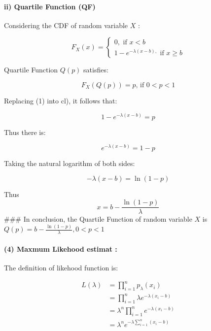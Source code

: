 \documentclass[
]{article}
\begin{document}
\paragraph{ii) Quartile Function (QF)}\label{ii-quartile-function-qf}

Considering the CDF of random variable \(X\) :

\[
F_{X}(x)=\left\{\begin{array}{l}
0, \text { if } x<b  \tag{1}\\
1-e^{-\lambda(x-b),} \text { if } x \geqslant b
\end{array}\right.
\]

Quartile Function \(Q(p)\) satisfies:

\[
\begin{equation*}
F_{X}(Q(p))=p \text {, if } 0<p<1 \tag{2}
\end{equation*}
\]

Replacing (1) into cl), it follows that:

\[
\begin{equation*}
1-e^{-\lambda(x-b)}=p \tag{3}
\end{equation*}
\]

Thus there is:

\[
\begin{equation*}
e^{-\lambda(x-b)}=1-p \tag{4}
\end{equation*}
\]

Taking the natural logarithm of both sides:

\[
\begin{equation*}
-\lambda(x-b)=\ln (1-p) \tag{5}
\end{equation*}
\]

Thus \[
\begin{equation*}
x=b-\frac{\ln (1-p)}{\lambda} \tag{6}
\end{equation*}
\] \#\#\# In conclusion, the Quartile Function of random variable \(X\)
is \(Q(p)=b-\frac{\ln (1-p)}{\lambda}, 0<p<1\)

\paragraph{\texorpdfstring{(4) Maxmum Likehood estimat
\MLE:}{(4) Maxmum Likehood estimat :}}\label{maxmum-likehood-estimat}

The definition of likehood function is:

\[
\begin{align*}
L(\lambda) & =\prod_{i=1}^{n} p_{\lambda}\left(x_{i}\right) \\
& =\prod_{i=1}^{n} \lambda e^{-\lambda\left(x_{i}-b\right)} \\
& =\lambda^{n} \prod_{i=1}^{n} e^{-\lambda\left(x_{i}-b\right)} \\
& =\lambda^{n} e^{-\lambda \sum_{i=1}^{n}\left(x_{i}-b\right)} \tag{1}
\end{align*}
\]
\end{document}
